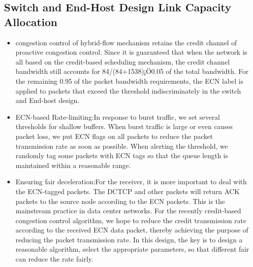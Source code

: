 \documentclass[conference]{IEEEtran}
\begin{document}
\subsection{Switch and End-Host Design Link Capacity Allocation}
\begin{itemize}
\item  congestion control of hybrid-flow mechanism retains the credit channel of proactive congestion control. Since it is guaranteed that when the network is all based on the credit-based scheduling mechanism, the credit channel bandwidth still accounts for 84/(84+1538)¡Ö0.05
    of the total bandwidth. For the remaining 0.95 of the packet bandwidth requirements, the ECN label is applied to packets that exceed the threshold indiscriminately in the switch and End-host design.
\item ECN-based Rate-limiting:In response to burst traffic, we set several thresholds for shallow buffers. When burst traffic is large or even causes packet loss, we put ECN flags on all packets to reduce the packet transmission rate as soon as possible. When alerting the threshold, we randomly tag some packets with ECN tags so that the queue length is maintained within a reasonable range.
\item Ensuring fair deceleration:For the receiver, it is more important to deal with the ECN-tagged packets. The DCTCP and other packets will return ACK packets to the source node according to the ECN packets. This is the mainstream practice in data center networks. For the recently credit-based congestion control algorithm, we hope to reduce the credit transmission rate according to the received ECN data packet, thereby achieving the purpose of reducing the packet transmission rate. In this design, the key is to design a reasonable algorithm, select the appropriate parameters, so that different fair can reduce the rate fairly.
\end{itemize}
\end{document}
